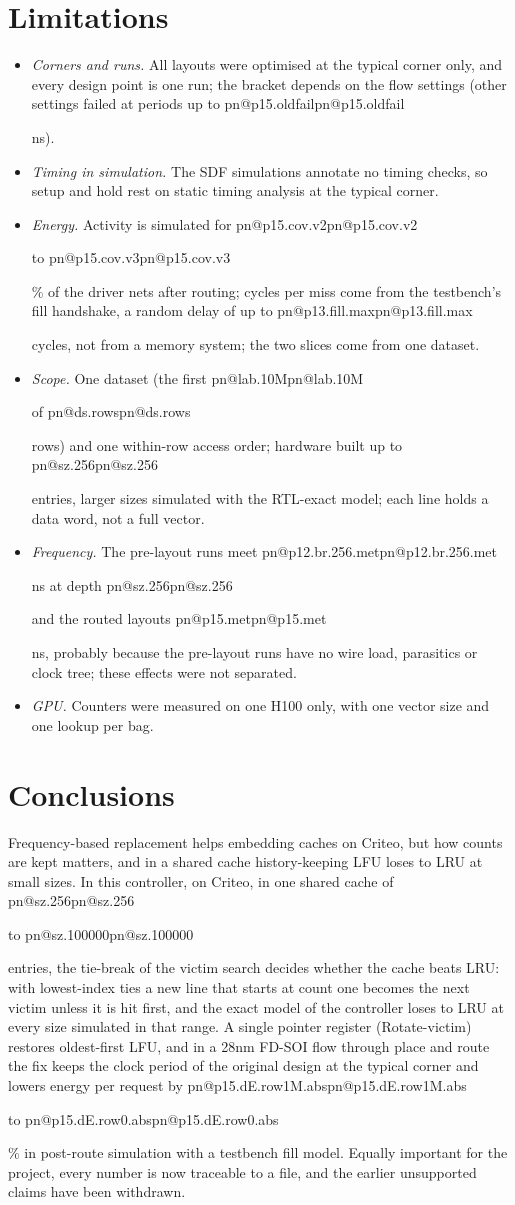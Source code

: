 \documentclass[11pt,a4paper]{report}
\makeatletter
\DeclareRobustCommand{\R}[1]{\ifcsname pn@#1\endcsname\csname pn@#1\endcsname\else
  \PackageError{report}{number key '#1' is not defined in macros.tex}{Run tools/make_paper_macros.py --target report}\fi}
\makeatother
\begin{document}
\section{Limitations}
\begin{itemize}
\item \emph{Corners and runs.} All layouts were optimised at the typical corner only, and every design point is one
run; the bracket depends on the flow settings (other settings failed at periods up to \R{p15.oldfail} ns).
\item \emph{Timing in simulation.} The SDF simulations annotate no timing checks, so setup and hold rest on static
timing analysis at the typical corner.
\item \emph{Energy.} Activity is simulated for \R{p15.cov.v2} to \R{p15.cov.v3}\% of the driver nets after routing;
cycles per miss come from the testbench's fill handshake, a random delay of up to \R{p13.fill.max} cycles, not from a
memory system; the two slices come from one dataset.
\item \emph{Scope.} One dataset (the first \R{lab.10M} of \R{ds.rows} rows) and one within-row access order; hardware
built up to \R{sz.256} entries, larger sizes simulated with the RTL-exact model; each line holds a data word, not a
full vector.
\item \emph{Frequency.} The pre-layout runs meet \R{p12.br.256.met} ns at depth \R{sz.256} and the routed layouts
\R{p15.met} ns, probably because the pre-layout runs have no wire load, parasitics or clock tree; these effects were
not separated.
\item \emph{GPU.} Counters were measured on one H100 only, with one vector size and one lookup per bag.
\end{itemize}

\section{Conclusions}
Frequency-based replacement helps embedding caches on Criteo, but how counts are kept matters, and in a shared cache
history-keeping LFU loses to LRU at small sizes. In this controller, on Criteo, in one shared cache of \R{sz.256} to \R{sz.100000} entries, the tie-break of the victim search decides whether the cache beats LRU: with lowest-index ties a new line that starts at count one becomes the next victim unless it is hit first, and the exact model of the controller loses to LRU at every size simulated in that range. A single pointer register (Rotate-victim) restores oldest-first LFU, and in a 28nm FD-SOI flow
through place and route the fix keeps the clock period of the original design at the typical corner and lowers energy
per request by \R{p15.dE.row1M.abs} to \R{p15.dE.row0.abs}\% in post-route simulation with a testbench fill model.
Equally important for the project, every number is now traceable to a file, and the earlier unsupported claims have
been withdrawn.
\end{document}
